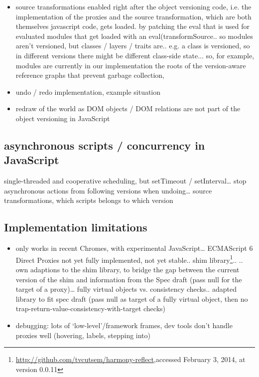 \begin{itemize}
    \item source transformations enabled right after the object versioning code, i.e. the implementation of the proxies and the source transformation, which are both themselves javascript code, gets loaded. by patching the eval that is used for evaluated modules that get loaded with an eval(transformSource.. so modules aren’t versioned, but classes / layers / traits are.. e.g. a class is versioned, so in different versions there might be different class-side state... so, for example, modules are currently in our implementation the roots of the version-aware reference graphs that prevent garbage collection, 
\end{itemize}


\begin{itemize}
    \item undo / redo implementation, example situation
    \item redraw of the world as DOM objects / DOM relations are not part of the object versioning in JavaScript
\end{itemize}




\subsection{asynchronous scripts / concurrency in JavaScript}

single-threaded and cooperative scheduling, but setTimeout / setInterval… stop asynchronous actions from following versions when undoing… source transformations, which scripts belongs to which version




\subsection{Implementation limitations}

\begin{itemize}
    \item only works in recent Chromes, with experimental JavaScript… ECMAScript 6 Direct Proxies not yet fully implemented, not yet stable.. shim library\footnote{\url{http://github.com/tvcutsem/harmony-reflect},\goodbreak accessed February 3, 2014, at version 0.0.11}..
.. own adaptions to the shim library, to bridge the gap between the current version of the shim and information from the Spec draft (pass null for the target of a proxy)… fully virtual objects vs. consistency checks.. adapted library to fit spec draft (pass null as target of a fully virtual object, then no trap-return-value-consistency-with-target checks)
\end{itemize}
    


\begin{itemize}
    \item debugging: lots of ‘low-level’/framework frames, dev tools don’t handle proxies well (hovering, labels, stepping into)
\end{itemize}
